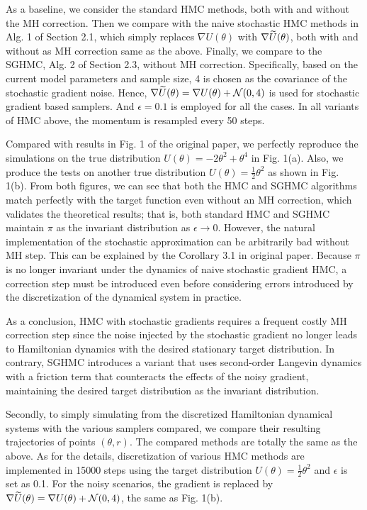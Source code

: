 As a baseline, we consider the standard HMC methods, both with and without the MH correction. Then we compare with the naive stochastic HMC methods in Alg. 1 of Section 2.1, which simply replaces $\nabla U(\theta)$ with $\nabla \widetilde{U}(\theta)$, both with and without as MH correction same as the above. Finally, we compare to the SGHMC, Alg. 2 of Section 2.3, without MH correction. Specifically, based on the current model parameters and sample size, 4 is chosen as the covariance of the stochastic gradient noise. Hence, $\nabla \widetilde{U}(\theta) = \nabla U(\theta) + \mathcal{N}(0,4)$ is used for stochastic gradient based samplers. And $\epsilon = 0.1$  is employed for all the cases. In all variants of HMC above, the momentum is resampled every 50 steps.




Compared with results in Fig. 1 of the original paper, we perfectly reproduce the simulations on the true distribution $U(\theta) = -2\theta^2 + \theta^4$ in Fig. 1(a). Also, we produce the tests on another true distribution $U(\theta) = \frac{1}{2}\theta^2$ as shown in Fig. 1(b). From both figures, we can see that both the HMC and SGHMC algorithms match perfectly with the target function even without an MH correction, which validates the theoretical results; that is, both standard HMC and SGHMC maintain $\pi$ as the invariant distribution as $\epsilon \rightarrow 0$. However, the natural implementation of the stochastic approximation can be arbitrarily bad without MH step. This can be explained by the Corollary 3.1 in original paper. Because $\pi$ is no longer invariant under the dynamics of naive stochastic gradient HMC, a correction step must be introduced even before considering errors introduced by the discretization of the dynamical system in practice.

As a conclusion, HMC with stochastic gradients requires a frequent costly MH correction step since the noise injected by the stochastic gradient no longer leads to Hamiltonian dynamics with the desired stationary target distribution. In contrary, SGHMC introduces a variant that uses second-order Langevin dynamics with a friction term that counteracts the effects of the noisy gradient, maintaining the desired target distribution as the invariant distribution.

Secondly, to simply simulating from the discretized Hamiltonian dynamical systems with the various samplers compared, we compare their resulting trajectories of points $(\theta,r)$.  The compared methods are totally the same as the above. As for the details, discretization of various HMC methods are implemented in 15000 steps using the target distribution $U(\theta) = \frac{1}{2}\theta^2$ and $\epsilon$ is set as 0.1. For the noisy scenarios, the gradient is replaced by $\nabla \widetilde{U}(\theta) = \nabla U(\theta) + \mathcal{N}(0,4)$, the same as Fig. 1(b).



